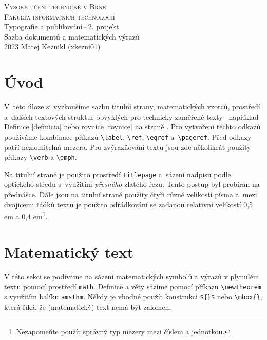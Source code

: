 \documentclass[a4paper, twocolumn, 11pt]{article}
\begin{document}
\begin{titlepage}
    \begin{center}
        {\Huge\textsc{Vysoké učení technické v Brně \\[0.5em]}}
        {\huge\textsc{Fakulta informačních technologií}}\\
        {\LARGE Typografie a publikování\,--\,2. projekt \\[0.4em]
        Sazba dokumentů a matematických výrazů}\\
        {\Large 2023 \hfill Matej Keznikl (xkezni01)}
    \end{center}
\end{titlepage}



\section*{Úvod}

V~této úloze si vyzkoušíme sazbu titulní strany, matematických vzorců, prostředí a~dalších textových struktur obvyklých pro technicky zaměřené texty\,--\,například Definice \ref{definicia} nebo rovnice \eqref{rovnice} na straně \pageref{definicia}. Pro vytvoření těchto odkazů používáme kombinace příkazů \verb|\label|, \verb|\ref|, \verb|\eqref| a~\verb|\pageref|. Před odkazy patří nezlomitelná mezera. Pro zvýrazňování textu jsou zde několikrát použity příkazy \verb|\verb| a \verb|\emph|. 

Na titulní straně je použito prostředí \texttt{titlepage} a~sázení nadpisu podle optického středu s~využitím \emph{přesného} zlatého řezu. Tento postup byl probírán na přednášce. Dále jsou na titulní straně použity čtyři různé velikosti písma a~mezi dvojicemi řádků textu je použito odřádkování se zadanou relativní velikostí 0,5 em a 0,4 em\footnote[1]{Nezapomeňte použít správný typ mezery mezi číslem a jednotkou.}.

\section{Matematický text}
V této sekci se podíváme na sázení matematických symbolů a výrazů v plynulém textu pomocí prostředí \verb|math|. Definice a věty sázíme pomocí příkazu  \verb|\newtheorem| s využitím balíku \verb|amsthm|. Někdy je vhodné použít konstrukci \verb|${}$| nebo 
\verb|\mbox{}|, která říká, že (matematický) text nemá být zalomen. 
\end{document}

